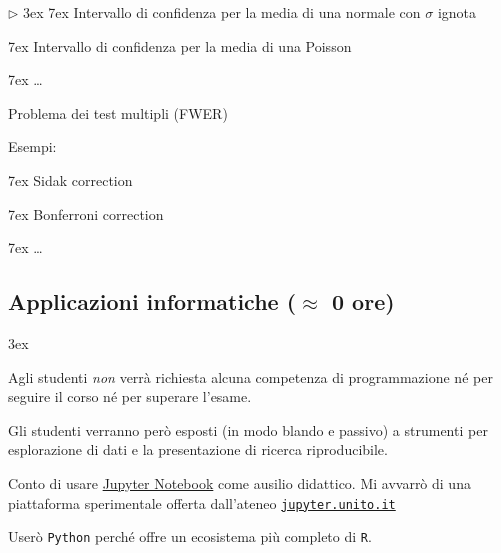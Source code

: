 \documentclass[10pt]{article}
\newcommand{\mylabel}[1]{#1\hfill}
\renewenvironment{itemize}
  {\begin{list}{$\triangleright$}{%
   \baselineskip3ex
   \setlength{\parskip}{4mm}
   \setlength{\topsep}{.4\baselineskip}
   \setlength{\rightmargin}{0mm}
   \setlength{\listparindent}{0mm}
   \setlength{\itemindent}{0mm}
   \setlength{\labelwidth}{2ex}
   \setlength{\itemsep}{.4\baselineskip}
   \setlength{\parsep}{0mm}
   \setlength{\partopsep}{0mm}
   \setlength{\labelsep}{1ex}
   \setlength{\leftmargin}{\labelwidth+\labelsep}
   \let\makelabel\mylabel}}{%
   \end{list}\vspace*{-1.3mm}}
\begin{document}
\begin{itemize}
  \noindent\kern7ex Intervallo di confidenza per la media di una normale con $\sigma$ ignota
  
  \noindent\kern7ex Intervallo di confidenza per la media di una Poisson

  \noindent\kern7ex \ldots\hfill{} 
  
  
\item Problema dei test multipli (FWER)\hfill{} 

Esempi:
  
  \noindent\kern7ex Sidak correction

  \noindent\kern7ex Bonferroni correction
  
  \noindent\kern7ex \ldots\hfill{} 

\end{itemize}


\clearpage
\subsection{Applicazioni informatiche (\boldmath$\approx$ 0 ore)} 
\baselineskip3ex

Agli studenti \textit{non\/} verrà richiesta alcuna competenza di programmazione né per seguire il corso né per superare l'esame. 

Gli studenti verranno però esposti (in modo blando e passivo) a strumenti per esplorazione di dati e la presentazione di ricerca riproducibile.

Conto di usare \href{http://jupyter.org}{Jupyter Notebook} come ausilio didattico. Mi avvarrò di una piattaforma sperimentale offerta dall'ateneo \href{https://www.jupyter.unito.it}{\tt jupyter.unito.it}

Userò {\tt Python\/} perché offre un ecosistema più completo di {\tt R}.%

\end{document}
